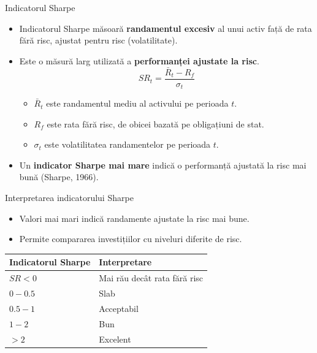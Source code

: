 \documentclass[9pt, aspectratio=169, t]{beamer}
\theoremstyle{definition}
\begin{document}
\begin{frame}{Indicatorul Sharpe}
\begin{itemize}
    \item Indicatorul Sharpe măsoară \textbf{randamentul excesiv} al unui activ față de rata fără risc, ajustat pentru risc (volatilitate).
    \item Este o măsură larg utilizată a \textbf{performanței ajustate la risc}.
    \[
    SR_t = \frac{\bar{R}_t - R_f}{\sigma_t}
    \]
    \begin{itemize}
        \item $\bar{R}_t$ este randamentul mediu al activului pe perioada $t$.
        \item $R_f$ este rata fără risc, de obicei bazată pe obligațiuni de stat.
        \item $\sigma_t$ este volatilitatea randamentelor pe perioada $t$.
    \end{itemize}
    \item Un \textbf{indicator Sharpe mai mare} indică o performanță ajustată la risc mai bună (Sharpe, 1966).
\end{itemize}
\end{frame}

\begin{frame}{Interpretarea indicatorului Sharpe}
\begin{itemize}
    \item Valori mai mari indică randamente ajustate la risc mai bune.
    \item Permite compararea investițiilor cu niveluri diferite de risc.
\end{itemize}

\vspace{0.3cm}

\begin{center}
\begin{tabular}{>{\centering\arraybackslash}p{3cm} >{\centering\arraybackslash}p{4cm}}
\toprule
\textbf{Indicatorul Sharpe} & \textbf{Interpretare} \\
\midrule
\rowcolor{Crimson!30} $SR < 0$ & Mai rău decât rata fără risc \\
\rowcolor{Orange!30} $0 - 0.5$ & Slab \\
\rowcolor{Amber!30} $0.5 - 1$ & Acceptabil \\
\rowcolor{Forest!20} $1 - 2$ & Bun \\
\rowcolor{Forest!40} $> 2$ & Excelent \\
\bottomrule
\end{tabular}
\end{center}
\end{frame}
\end{document}
